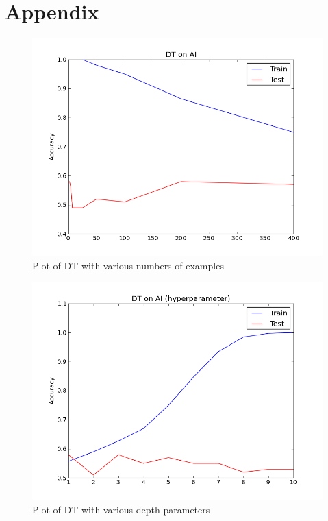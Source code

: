 \section*{Appendix}

\begin{figure}[here]
	\caption{Plot of DT with various numbers of examples}
	\label{fig:dt_examples}
	\includegraphics[width=6.5in]{images/dt_examples.png}
\end{figure}

\begin{figure}[here]
	\caption{Plot of DT with various depth parameters}
	\label{fig:dt_depth}
	\includegraphics[width=6.5in]{images/dt_depth.png}
\end{figure}

